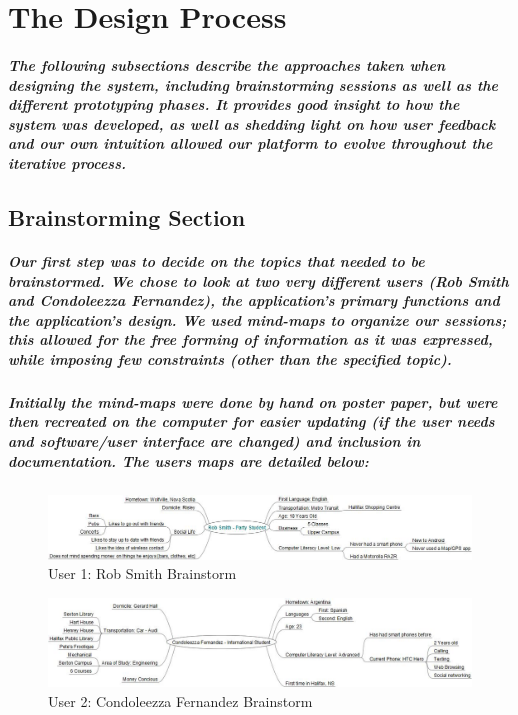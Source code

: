 \documentclass{report}
\begin{document}
\chapter{The Design Process}
    \paragraph{The following subsections describe the approaches taken when
    designing the system, including brainstorming sessions as well as the different
    prototyping phases. It provides good insight to how the system was developed, as
    well as shedding light on how user feedback and our own intuition allowed our
    platform to evolve throughout the iterative process.}
\section{Brainstorming Section}
    \paragraph{Our first step was to decide on the topics that needed to be
    brainstormed. We chose to look at two very different users (Rob Smith and
    Condoleezza Fernandez), the application's primary functions and the
    application's design. We used mind-maps to organize our sessions; this allowed
    for the free forming of information as it was expressed, while imposing few
    constraints (other than the specified topic).}
    \paragraph{Initially the mind-maps were done by hand on poster paper, but
    were then recreated on the computer for easier updating (if the user needs and
    software/user interface are changed) and inclusion in documentation. The users
    maps are detailed below:}
    \begin{figure}
        \centering
            \includegraphics[width=\textwidth]{img/figure411.jpg}
        \caption{User 1: Rob Smith Brainstorm}
    \end{figure}
    \begin{figure}
        \centering
            \includegraphics[width=\textwidth]{img/figure412.jpg}
        \caption{User 2: Condoleezza Fernandez Brainstorm}
    \end{figure}
\end{document}
